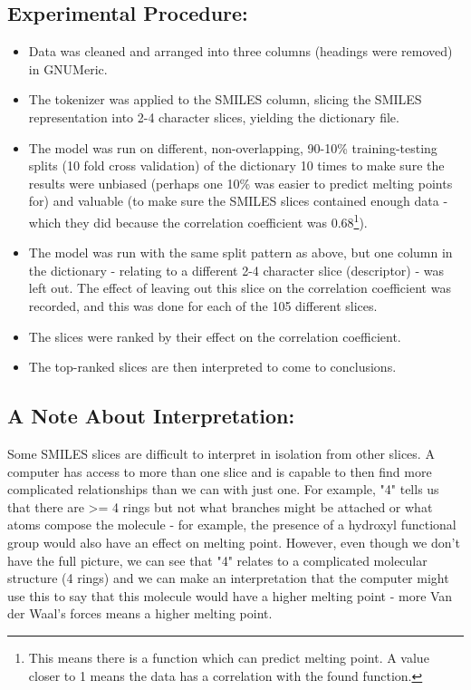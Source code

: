 \documentclass[11pt]{article}
\begin{document}
\subsection{Experimental Procedure:}
\label{sec:org6fcc02c}
\begin{itemize}
\item Data was cleaned and arranged into three columns (headings were removed) in GNUMeric.
\item The tokenizer was applied to the SMILES column, slicing the SMILES representation into 2-4 character slices, yielding the dictionary file.
\item The model was run on different, non-overlapping, 90-10\% training-testing splits (10 fold cross validation) of the dictionary 10 times to make sure the results were unbiased (perhaps one 10\% was easier to predict melting points for) and valuable (to make sure the SMILES slices contained enough data - which they did because the correlation coefficient was 0.68\footnote{This means there is a function which can predict melting point. A value closer to 1 means the data has a correlation with the found function.}).
\item The model was run with the same split pattern as above, but one column in the dictionary - relating to a different 2-4 character slice (descriptor) - was left out. The effect of leaving out this slice on the correlation coefficient was recorded, and this was done for each of the 105 different slices.
\item The slices were ranked by their effect on the correlation coefficient.
\item The top-ranked slices are then interpreted to come to conclusions.
\end{itemize}
\subsection{A Note About Interpretation:}
\label{sec:org0c6b64d}
   Some SMILES slices are difficult to interpret in isolation from other slices. A computer has access to more than one slice and
is capable to then find more complicated relationships than we can with just one. For example, "4" tells us that there are >= 4 rings
but not what branches might be attached or what atoms compose the molecule - for example, the presence of
a hydroxyl functional group would also have an effect on melting point. However, even though we don't have the full picture, we can see that "4"
relates to a complicated molecular structure (4 rings) and we can make an interpretation that the computer might use this to say that this molecule would have a higher melting point - more
Van der Waal's forces means a higher melting point.  
\end{document}
